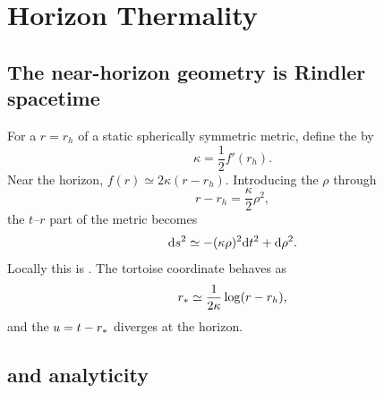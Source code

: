 \chapter{Horizon Thermality}
\label{chap:horizon-thermality}

\section{The near-horizon geometry is Rindler spacetime}

For a  $r=r_h$ of a static spherically symmetric metric, define the  by
\begin{equation}
\kappa
=
\frac{1}{2}f'(r_h).
\label{eq:surface-gravity-static}
\end{equation}
Near the horizon, $f(r)\simeq2\kappa(r-r_h)$. Introducing the  $\rho$ through
\begin{equation}
r-r_h
=
\frac{\kappa}{2}\rho^2,
\end{equation}
the $t$--$r$ part of the metric becomes
\begin{equation}
\mathrm{d} s^2
\simeq
-(\kappa\rho)^2\mathrm{d} t^2
+\mathrm{d}\rho^2.
\label{eq:near-horizon-rindler}
\end{equation}
Locally this is . The tortoise coordinate behaves as
\begin{equation}
r_*
\simeq
\frac{1}{2\kappa}
\log(r-r_h),
\end{equation}
and the  $u=t-r_*$ diverges at the horizon.

\section{ and analyticity}

